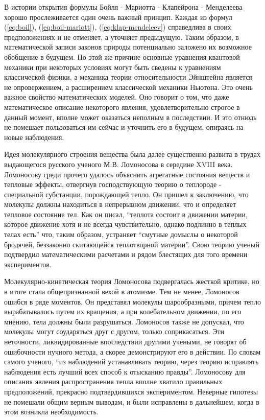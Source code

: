 В истории открытия формулы Бойля - Мариотта - Клапейрона - Менделеева хорошо прослеживается один очень важный принцип.
Каждая из формул (\ref{eq:boil}), (\ref{eq:boil-mariott}), (\ref{eq:klap-mendeleev}) справедлива в своих предположениях и не отменяет, а уточняет предыдущую.
Таким образом, в математической записи законов природы потенциально заложено их возможное обобщение в будущем.
По этой же причине основные уравнения квантовой механики при некоторых условиях могут быть сведены к уравнениям классической физики, а механика теории относительности Эйнштейна является не опровержением, а расширением классической механики Ньютона. 
Это очень важное свойство математических моделей.
Оно говорит о том, что даже математическое описание некоторого явления, удовлетворительно строгое в данный момент, вполне может оказаться неполным в последствии.
И это отнюдь не помешает пользоваться им сейчас и уточнить его в будущем, опираясь на новые наблюдения.

Идея молекулярного строения вещества была далее существенно развита в трудах выдающегося русского ученого М.В. Ломоносова в середине XVIII века.
Ломоносову среди прочего удалось объяснить агрегатные состояния веществ и тепловые эффекты, отвергнув господствующую теорию о теплороде - специальной субстанции, порождающей тепло.
Он пришел к заключению, что молекулы должны находиться в непрерывном движении, что и определяет тепловое состояние тел.
Как он писал, ``теплота состоит в движении материи, которое движение хотя и не всегда чувствительно, однако подлинно в теплых телах есть'' что, таким образом, устраняет ``смутные домыслы о некоторой бродячей, беззаконно скитающейся теплотворной материи''.
Свою теорию ученый подтвердил математическими расчетами и рядом блестящих для того времени экспериментов.

Молекулярно-кинетическая теория Ломоносова подвергалась жесткой критике, но в итоге стала общепризнанной вехой в атомизме.
Тем не менее, Ломоносов ошибся в ряде моментов.
Он представял молекулы шарообразными, причем тепло вырабатывалось путем их вращения, а при колебательном движении, по его мнению, тела должны были разрушаться. 
Ломоносов также не допускал, что молекулы могут соударяться друг с другом, только соприкасаться.
Эти неточности, ликвидированные впоследствии другими учеными, не говорят об ошибочности нучного метода, а скорее демонстрируют его в действии.
По словам самого ученого, ``из наблюдений устанавливать теорию, через теорию исправлять наблюдения есть лучший всех способ к отысканию правды''.
Ломоносову для описания явления распространения тепла вполне хватило правильных предположений, прекрасно подтвердившихся экспериментом.
Неверные гипотезы не помешали общим верным выводам, и были исправлены в дальнейшем, когда в этом возникла необходимость.

